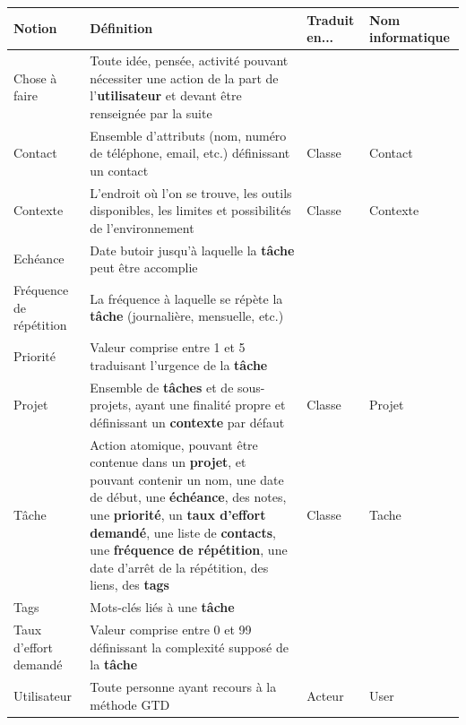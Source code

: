 \begin{tabular}{|p{1.7cm}|p{6cm}|p{1.7cm}|p{1.7cm}|}
\hline
\textbf{Notion} & \textbf{Définition} & \textbf{Traduit en...} & \textbf{Nom informatique} \\
\hline
Chose à faire & Toute idée, pensée, activité pouvant nécessiter une action de la part de l'\textbf{utilisateur} et devant être renseignée par la suite & & \\
\hline
Contact & Ensemble d'attributs (nom, numéro de téléphone, email, etc.) définissant un contact & Classe & Contact \\
\hline
Contexte & L'endroit où l'on se trouve, les outils disponibles, les limites et possibilités de l'environnement & Classe & Contexte \\
\hline
Echéance & Date butoir jusqu'à laquelle la \textbf{tâche} peut être accomplie & & \\
\hline
Fréquence de répétition & La fréquence à laquelle se répète la \textbf{tâche} (journalière, mensuelle, etc.) & & \\
\hline
Priorité & Valeur comprise entre 1 et 5 traduisant l'urgence de la \textbf{tâche} & & \\
\hline
Projet & Ensemble de \textbf{tâches} et de sous-projets, ayant une finalité propre et définissant un \textbf{contexte} par défaut & Classe & Projet \\
\hline
Tâche & Action atomique, pouvant être contenue dans un \textbf{projet}, et pouvant contenir un nom, une date de début, une \textbf{échéance}, des notes, une \textbf{priorité}, un \textbf{taux d'effort demandé}, une liste de \textbf{contacts}, une \textbf{fréquence de répétition}, une date d'arrêt de la répétition, des liens, des \textbf{tags} & Classe & Tache \\
\hline
Tags & Mots-clés liés à une \textbf{tâche} & & \\
\hline
Taux d'effort demandé & Valeur comprise entre 0 et 99 définissant la complexité supposé de la \textbf{tâche} & & \\
\hline
Utilisateur & Toute personne ayant recours à la méthode GTD & Acteur & User \\
\hline
\end{tabular}
\newpage
